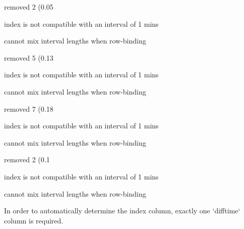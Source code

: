 \documentclass[
]{jss}
\begin{document}
\begin{CodeChunk}
\begin{CodeOutput}
removed 2 (0.05%
\end{CodeOutput}

\begin{CodeOutput}
index is not compatible with an interval of 1 mins
\end{CodeOutput}

\begin{CodeOutput}
cannot mix interval lengths when row-binding
\end{CodeOutput}

\begin{CodeOutput}
removed 5 (0.13%
\end{CodeOutput}

\begin{CodeOutput}
index is not compatible with an interval of 1 mins
\end{CodeOutput}

\begin{CodeOutput}
cannot mix interval lengths when row-binding
\end{CodeOutput}

\begin{CodeOutput}
removed 7 (0.18%
\end{CodeOutput}

\begin{CodeOutput}
index is not compatible with an interval of 1 mins
\end{CodeOutput}

\begin{CodeOutput}
cannot mix interval lengths when row-binding
\end{CodeOutput}

\begin{CodeOutput}
removed 2 (0.1%
\end{CodeOutput}

\begin{CodeOutput}
index is not compatible with an interval of 1 mins
\end{CodeOutput}

\begin{CodeOutput}
cannot mix interval lengths when row-binding
\end{CodeOutput}

\begin{CodeOutput}
In order to automatically determine the index column, exactly one `difftime`
column is required.
\end{CodeOutput}


\end{CodeChunk}
\end{document}
